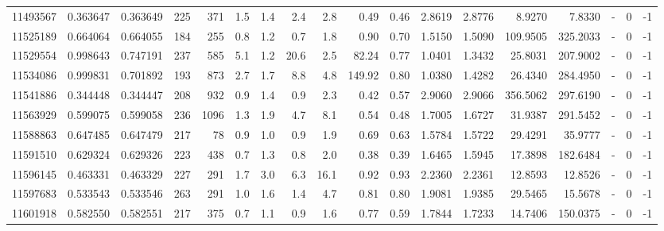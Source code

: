 \begin{tabular}{rrrrrrrrrrrrrrrlrr}
  11493567 & 0.363647 &   0.363649 &  225 &  371 &      1.5 &      1.4 &     2.4 &      2.8 &       0.49 &        0.46 &  2.8619 &  2.8776 &    8.9270 &    7.8330 &             - &        0 &         -1 \\
  11525189 & 0.664064 &   0.664055 &  184 &  255 &      0.8 &      1.2 &     0.7 &      1.8 &       0.90 &        0.70 &  1.5150 &  1.5090 &  109.9505 &  325.2033 &             - &        0 &         -1 \\
  11529554 & 0.998643 &   0.747191 &  237 &  585 &      5.1 &      1.2 &    20.6 &      2.5 &      82.24 &        0.77 &  1.0401 &  1.3432 &   25.8031 &  207.9002 &             - &        0 &         -1 \\
  11534086 & 0.999831 &   0.701892 &  193 &  873 &      2.7 &      1.7 &     8.8 &      4.8 &     149.92 &        0.80 &  1.0380 &  1.4282 &   26.4340 &  284.4950 &             - &        0 &         -1 \\
  11541886 & 0.344448 &   0.344447 &  208 &  932 &      0.9 &      1.4 &     0.9 &      2.3 &       0.42 &        0.57 &  2.9060 &  2.9066 &  356.5062 &  297.6190 &             - &        0 &         -1 \\
  11563929 & 0.599075 &   0.599058 &  236 & 1096 &      1.3 &      1.9 &     4.7 &      8.1 &       0.54 &        0.48 &  1.7005 &  1.6727 &   31.9387 &  291.5452 &             - &        0 &         -1 \\
  11588863 & 0.647485 &   0.647479 &  217 &   78 &      0.9 &      1.0 &     0.9 &      1.9 &       0.69 &        0.63 &  1.5784 &  1.5722 &   29.4291 &   35.9777 &             - &        0 &         -1 \\
  11591510 & 0.629324 &   0.629326 &  223 &  438 &      0.7 &      1.3 &     0.8 &      2.0 &       0.38 &        0.39 &  1.6465 &  1.5945 &   17.3898 &  182.6484 &             - &        0 &         -1 \\
  11596145 & 0.463331 &   0.463329 &  227 &  291 &      1.7 &      3.0 &     6.3 &     16.1 &       0.92 &        0.93 &  2.2360 &  2.2361 &   12.8593 &   12.8526 &             - &        0 &         -1 \\
  11597683 & 0.533543 &   0.533546 &  263 &  291 &      1.0 &      1.6 &     1.4 &      4.7 &       0.81 &        0.80 &  1.9081 &  1.9385 &   29.5465 &   15.5678 &             - &        0 &         -1 \\
  11601918 & 0.582550 &   0.582551 &  217 &  375 &      0.7 &      1.1 &     0.9 &      1.6 &       0.77 &        0.59 &  1.7844 &  1.7233 &   14.7406 &  150.0375 &             - &        0 &         -1 \\

\end{tabular}
